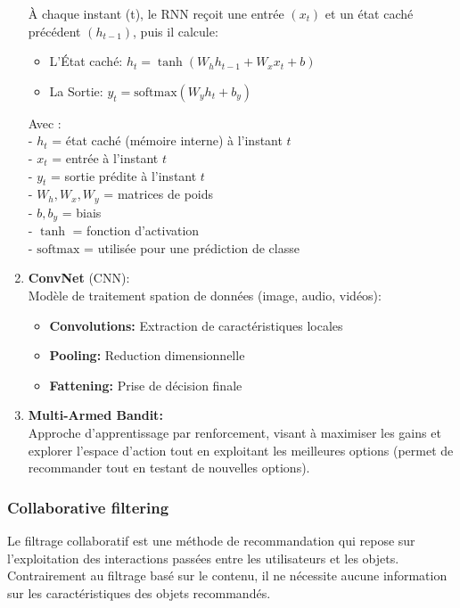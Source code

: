 \documentclass{article}
\begin{document}
\begin{enumerate}
        À chaque instant (t), le RNN reçoit une entrée \((x_t)\) et un état caché précédent \((h_{t-1})\), puis il calcule:
        \begin{itemize}
            \item L'État caché: \(h_t = \tanh(W_h h_{t-1} + W_x x_t + b)\)
            \item  La Sortie: \(y_t = \text{softmax}(W_y h_t + b_y)\)
        \end{itemize}
        Avec :\\
        - \( h_t \) = état caché (mémoire interne) à l’instant \( t \)\\
        - \( x_t \) = entrée à l’instant \( t \)\\
        - \( y_t \) = sortie prédite à l’instant \( t \)\\
        - \( W_h, W_x, W_y \) = matrices de poids\\
        - \( b, b_y \) = biais\\
        - \( \tanh \) = fonction d’activation\\
        - \( \text{softmax} \) = utilisée pour une prédiction de classe\\

        \item \textbf{ConvNet} (CNN):\\
        Modèle de traitement spation de données (image, audio, vidéos):
        \begin{itemize}
            \item \textbf{Convolutions:} Extraction de caractéristiques locales
            \item \textbf{Pooling:} Reduction dimensionnelle
            \item \textbf{Fattening:} Prise de décision finale
        \end{itemize}

        \item \textbf{Multi-Armed Bandit: }\\
        Approche d'apprentissage par renforcement, visant à maximiser les gains et explorer l'espace d'action tout en exploitant les meilleures options (permet de recommander tout en testant de nouvelles options).


    \end{enumerate}

    \subsubsection{Collaborative filtering}
    Le filtrage collaboratif est une méthode de recommandation qui repose sur l’exploitation des interactions passées entre les utilisateurs
    et les objets.
    Contrairement au filtrage basé sur le contenu, il ne nécessite aucune information sur les caractéristiques des objets recommandés.
\end{document}
